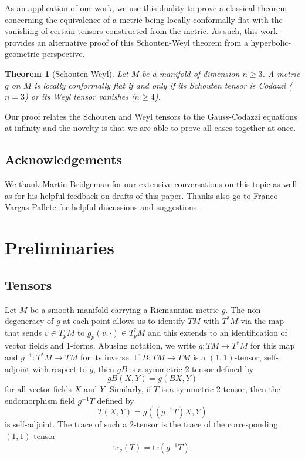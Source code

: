 \documentclass{amsart}
\newcommand{\tr}{\mathrm{tr}}
\newtheorem{bigthm}{Theorem}
\begin{document}
As an application of our work, we use this duality to prove a classical theorem concerning the equivalence of a metric being locally conformally flat with the vanishing of certain tensors constructed from the metric.
As such, this work provides an alternative proof of this Schouten-Weyl theorem from a hyperbolic-geometric perspective.

\begin{bigthm}[Schouten-Weyl]
Let $M$ be a manifold of dimension $n \geq 3$.
A metric $g$ on $M$ is locally conformally flat if and only if its Schouten tensor is Codazzi ($n = 3$) or its Weyl tensor vanishes ($n \geq 4$).
\end{bigthm}
\noindent
Our proof relates the Schouten and Weyl tensors to the Gauss-Codazzi equations at infinity and the novelty is that we are able to prove all cases together at once. 

\subsection*{Acknowledgements}
We thank Martin Bridgeman for our extensive conversations on this topic as well as for his helpful feedback on drafts of this paper.
Thanks also go to Franco Vargas Pallete for helpful discussions and suggestions. 


\section{Preliminaries}


\subsection{Tensors}

Let $M$ be a smooth manifold carrying a Riemannian metric $g$. 
The non-degeneracy of $g$ at each point allows us to identify $TM$ with $T^*M$ via the map that sends $v \in T_pM$ to $g_p(v,\cdot) \in T^*_pM$ and this extends to an identification of vector fields and 1-forms. 
Abusing notation, we write $g: TM \to T^*M$ for this map and $g^{-1}:T^*M \to TM$ for its inverse.
If $B:TM \to TM$ is a $(1,1)$-tensor, self-adjoint with respect to $g$, then $gB$ is a symmetric 2-tensor defined by
\[
gB(X,Y) = g(BX,Y)
\]
for all vector fields $X$ and $Y$.
Similarly, if $T$ is a symmetric 2-tensor, then the endomorphism field $g^{-1}T$ defined by 
\[
T(X,Y) = g( (g^{-1}T)X,Y)
\]
is self-adjoint.
The trace of such a $2$-tensor is the trace of the corresponding $(1,1)$-tensor
\[
\tr_g(T) = \tr(g^{-1}T).
\]
\end{document}
